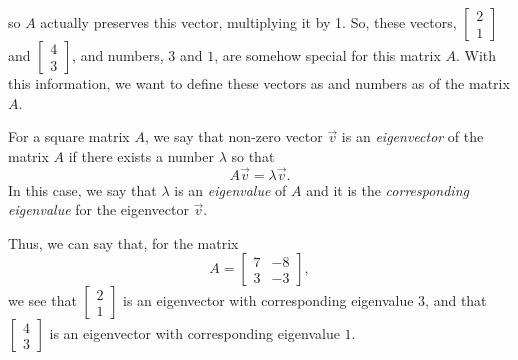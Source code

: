 \documentclass{ximera}
\begin{document}
so $A$ actually preserves this vector, multiplying it by 1. So, these vectors, $\begin{bmatrix} 2 \\ 1 \end{bmatrix}$ and $\begin{bmatrix} 4 \\ 3 \end{bmatrix}$, and numbers, $3$ and $1$, are somehow special for this matrix $A$. With this information, we want to define these vectors as \emph{} and numbers as \emph{} of the matrix $A$.

\begin{definition}
    For a square matrix $A$, we say that non-zero vector $\vec{v}$ is an \emph{eigenvector} of the matrix $A$ if there exists a number $\lambda$ so that 
    \[ 
        A \vec{v} = \lambda\vec{v}. 
    \] 
    In this case, we say that $\lambda$ is an \emph{eigenvalue} of $A$ and it is the \emph{corresponding eigenvalue} for the eigenvector $\vec{v}$. 
\end{definition}

Thus, we can say that, for the matrix 
\[ 
    A = 
    \begin{bmatrix} 
        7 & -8 \\ 
        3 & -3 
    \end{bmatrix}, 
\] 
we see that $\begin{bmatrix}2 \\ 1 \end{bmatrix}$ is an eigenvector with corresponding eigenvalue $3$, and that $\begin{bmatrix}4 \\ 3 \end{bmatrix}$ is an eigenvector with corresponding eigenvalue $1$.
\end{document}
